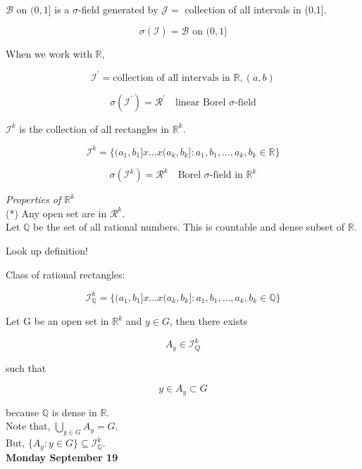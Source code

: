 \documentclass[11pt,fleqn]{book} %
\begin{document}
$\mathcal{B} \text{ on } (0,1]$ is a $\sigma$-field generated by $\mathcal{J} = $ collection of all intervals in (0,1].

	$$\sigma(\mathcal{I}) = \mathcal{B} \text{ on } (0,1]$$

When we work with $\mathbb{R}$, 

$$\mathcal{I}^\prime = \text{collection of all intervals in } \mathbb{R}, (a,b) $$

$$\sigma(\mathcal{I}^\prime) = \mathcal{R}^\prime \quad \text{linear Borel }\sigma\text{-field} $$


$\mathcal{I}^k $ is the collection of all rectangles in $\mathbb{R}^k$.

$$ \mathcal{I}^k = \{(a_1, b_1]x \dots x(a_k, b_k]: a_1, b_1, \dots, a_k, b_k \in \mathbb{R} \}$$

$$\sigma(\mathcal{I}^k) = \mathcal{R}^k \quad \text{Borel } \sigma\text{-field in } \mathbb{R}^k$$

\textit{Properties of $\mathbb{R}^k$}\\

(*) Any open set are in $\mathcal{R}^k$.\\

Let $\mathbb{Q}$ be the set of all rational numbers. This is countable and dense subset of $\mathbb{R}$. \\

\begin{definition}[Dense]
	Look up definition!
\end{definition}

Class of rational rectangles: 

$$ \mathcal{I}^k_\mathbb{Q} = \{(a_1, b_1]x \dots x(a_k, b_k]: a_1, b_1, \dots, a_k, b_k \in \mathbb{Q} \}$$

Let G be an open set in $\mathbb{R}^k$ and $y \in G$, then there exists
 
$$ A_y \in  \mathcal{I}^k_Q $$

such that

$$y \in A_y \subset G $$

because $\mathbb{Q}$ is dense in $\mathbb{R}$.\\

Note that, $\bigcup_{y\in G} A_y = G$. \\

But, $\{A_y: y \in G \} \subseteq \mathcal{I}^k_\mathbb{Q}$.\\


\textbf{Monday September 19}\\
\end{document}
